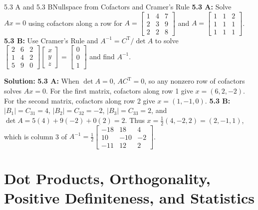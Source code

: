 \documentclass[11pt,a4paper,openany,oneside]{book}
\def\vect#1{#1}%
\def\mathbf#1{#1}%
\newcommand{\vect}[1]{\mathbf{#1}}
\newcommand{\T}{\mathrm{T}}
\numberwithin{equation}{chapter}
\begin{document}
\begin{example}{5.3 A and 5.3 B}{Nullspace from Cofactors and Cramer's Rule}
\textbf{5.3 A:} Solve $A\vect{x} = \vect{0}$ using cofactors along a row for $A = \begin{bmatrix}1&4&7\\2&3&9\\2&2&8\end{bmatrix}$ and $A = \begin{bmatrix}1&1&2\\1&1&1\\1&1&1\end{bmatrix}$.\\
\textbf{5.3 B:} Use Cramer's Rule and $A^{-1} = C^\T/\det A$ to solve $\begin{bmatrix}2&6&2\\1&4&2\\5&9&0\end{bmatrix}\begin{bmatrix}x\\y\\z\end{bmatrix} = \begin{bmatrix}0\\0\\1\end{bmatrix}$ and find $A^{-1}$.
\end{example}
\textbf{Solution:}
\textbf{5.3 A:} When $\det A = 0$, $AC^\T = \vect{0}$, so any nonzero row of cofactors solves $A\vect{x}=\vect{0}$. For the first matrix, cofactors along row 1 give $\vect{x} = (6, 2, -2)$. For the second matrix, cofactors along row 2 give $\vect{x} = (1, -1, 0)$.
\textbf{5.3 B:} $|B_1| = C_{31} = 4$, $|B_2| = C_{32} = -2$, $|B_3| = C_{33} = 2$, and $\det A = 5(4)+9(-2)+0(2) = 2$. Thus $\vect{x} = \frac{1}{2}(4,-2,2) = (2,-1,1)$, which is column 3 of $A^{-1} = \frac{1}{2}\begin{bmatrix}-18 & 18 & 4\\10 & -10 & -2\\-11 & 12 & 2\end{bmatrix}$.

\part{Dot Products, Orthogonality, Positive Definiteness, and Statistics}
\end{document}
